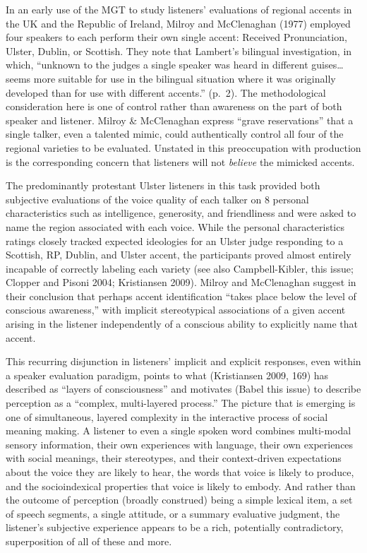 \documentclass[
  letterpaper,
  DIV=11,
  numbers=noendperiod]{scrartcl}
\begin{document}
In an early use of the MGT to study listeners' evaluations of regional
accents in the UK and the Republic of Ireland, Milroy and McClenaghan
(1977) employed four speakers to each perform their own single accent:
Received Pronunciation, Ulster, Dublin, or Scottish. They note that
Lambert's bilingual investigation, in which, ``unknown to the judges a
single speaker was heard in different guises\ldots{} seems more suitable
for use in the bilingual situation where it was originally developed
than for use with different accents.'' (p.~2). The methodological
consideration here is one of control rather than awareness on the part
of both speaker and listener. Milroy \& McClenaghan express ``grave
reservations'' that a single talker, even a talented mimic, could
authentically control all four of the regional varieties to be
evaluated. Unstated in this preoccupation with production is the
corresponding concern that listeners will not \emph{believe} the
mimicked accents.

The predominantly protestant Ulster listeners in this task provided both
subjective evaluations of the voice quality of each talker on 8 personal
characteristics such as intelligence, generosity, and friendliness and
were asked to name the region associated with each voice. While the
personal characteristics ratings closely tracked expected ideologies for
an Ulster judge responding to a Scottish, RP, Dublin, and Ulster accent,
the participants proved almost entirely incapable of correctly labeling
each variety (see also Campbell-Kibler, this issue; Clopper and Pisoni
2004; Kristiansen 2009). Milroy and McClenaghan suggest in their
conclusion that perhaps accent identification ``takes place below the
level of conscious awareness,'' with implicit stereotypical associations
of a given accent arising in the listener independently of a conscious
ability to explicitly name that accent.

This recurring disjunction in listeners' implicit and explicit
responses, even within a speaker evaluation paradigm, points to what
(Kristiansen 2009, 169) has described as ``layers of consciousness'' and
motivates (Babel this issue) to describe perception as a ``complex,
multi-layered process.'' The picture that is emerging is one of
simultaneous, layered complexity in the interactive process of social
meaning making. A listener to even a single spoken word combines
multi-modal sensory information, their own experiences with language,
their own experiences with social meanings, their stereotypes, and their
context-driven expectations about the voice they are likely to hear, the
words that voice is likely to produce, and the socioindexical properties
that voice is likely to embody. And rather than the outcome of
perception (broadly construed) being a simple lexical item, a set of
speech segments, a single attitude, or a summary evaluative judgment,
the listener's subjective experience appears to be a rich, potentially
contradictory, superposition of all of these and more.
\end{document}

